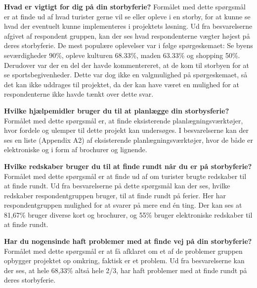\textbf{Hvad er vigtigt for dig på din storbyferie?}\newline
Formålet med dette spørgsmål er at finde ud af hvad turister gerne vil se eller opleve i en storby, for at kunne se hvad der eventuelt kunne implementeres i projektets løsning.\newline
Ud fra besvarelserne afgivet af respondent gruppen, kan der ses hvad respondenterne vægter højest på deres storbyferie. De mest populære oplevelser var i følge spørgeskemaet: Se byens seværdigheder 90\%, opleve kulturen 68.33\%, maden 63.33\% og shopping 50\%. Derudover var der en del der havde kommentereret, at de kom til storbyen for at se sportsbegivenheder. Dette var dog ikke en valgmulighed på spørgeskemaet, så det kan ikke uddrages til projektet, da der kan have været en mulighed for at respondenterne ikke havde tænkt over dette svar.\newline

\textbf{Hvilke hjælpemidler bruger du til at planlægge din storbysferie?}\newline
Formålet med dette spørgsmål er, at finde eksisterende planlægningsværktøjer, hvor fordele og ulemper til dette projekt kan undersøges.\newline 
I besvarelserne kan der ses en liste (Appendix A2) af eksisterende planlægningsværktøjer, hvor de både er elektroniske og i form af brochurer og lignende.\newline
 
\textbf{Hvilke redskaber bruger du til at finde rundt når du er på storbyferie?}\newline
Formålet med dette spørgsmål er at finde ud af om turister brugte redskaber til at finde rundt.\newline 
Ud fra besvarelserne på dette spørgsmål kan der ses, hvilke redskaber respondentgruppen bruger, til at finde rundt på ferier. Her har respondentgruppen mulighed for at svarer på mere end én ting. Der kan ses at 81,67\% bruger diverse kort og brochurer, og 55\% bruger elektroniske redskaber til at finde rundt. \newline

\textbf{Har du nogensinde haft problemer med at finde vej på din storbyferie?}\newline
Formålet med dette spørgsmål er at få afklaret om et af de problemer gruppen opbygger projektet op omkring, faktisk er et problem.\newline
Ud fra besvarelserne kan der ses, at hele 68,33\% altså hele 2/3, har haft problemer med at finde rundt på deres storbyferie.\newline

